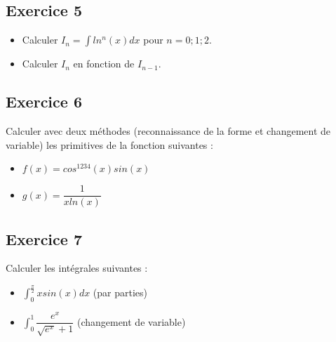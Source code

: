 \documentclass[letterpaper,10pt,french]{jupyterBook}
\begin{document}
\subsection{Exercice 5}
\label{\detokenize{exoint:exercice-5}}\begin{itemize}
\item {} 
\sphinxAtStartPar
Calculer \(I_n = \int ln^n (x)dx\) pour \(n = 0; 1; 2\).

\item {} 
\sphinxAtStartPar
Calculer \(I_n\) en fonction de \(I_{n-1}\).

\end{itemize}


\subsection{Exercice 6}
\label{\detokenize{exoint:exercice-6}}
\sphinxAtStartPar
Calculer avec deux méthodes (reconnaissance de la forme et changement de variable) les primitives de la fonction suivantes :
\begin{itemize}
\item {} 
\sphinxAtStartPar
\(f(x) = cos^{1234}(x)sin(x)\)

\item {} 
\sphinxAtStartPar
\( g(x) = \dfrac{1}{xln(x)}\)

\end{itemize}


\subsection{Exercice 7}
\label{\detokenize{exoint:exercice-7}}
\sphinxAtStartPar
Calculer les intégrales suivantes :
\begin{itemize}
\item {} 
\sphinxAtStartPar
\(\int_0^{\frac{\pi}{2}} xsin(x)dx\) (par parties)

\item {} 
\sphinxAtStartPar
\(\int_0^1 \dfrac{e^x}{\sqrt{e^x}+1}\) (changement de variable)

\end{itemize}







\renewcommand{\indexname}{Index}
\printindex
\end{document}
